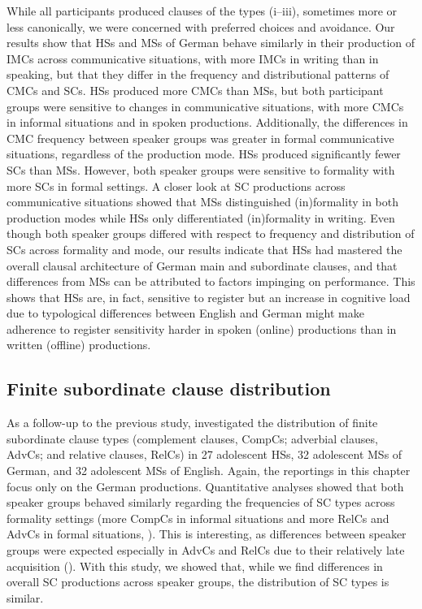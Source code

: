 \documentclass[output=paper]{langscibook}
\begin{document}
While all participants produced clauses of the types (i--iii), sometimes more or less canonically, we were concerned with preferred choices and avoidance. Our results show that HSs and MSs of German behave similarly in their production of IMCs across communicative situations, with more IMCs in writing than in speaking, but that they differ in the frequency and distributional patterns of CMCs and SCs. HSs produced more CMCs than MSs, but both participant groups were sensitive to changes in communicative situations, with more CMCs in informal situations and in spoken productions. Additionally, the differences in CMC frequency between speaker groups was greater in formal communicative situations, regardless of the production mode. HSs produced significantly fewer SCs than MSs. However, both speaker groups were sensitive to formality with more SCs in formal settings. A closer look at SC productions across communicative situations showed that MSs distinguished (in)formality in both production modes while HSs only differentiated (in)formality in writing. Even though both speaker groups differed with respect to frequency and distribution of SCs across formality and mode, our results indicate that HSs had mastered the overall clausal architecture of German main and subordinate clauses, and that differences from MSs can be attributed to factors impinging on performance. This shows that HSs are, in fact, sensitive to register but an increase in cognitive load due to typological differences between English and German might make adherence to register sensitivity harder in spoken (online) productions than in written (offline) productions.

\subsection{Finite subordinate clause distribution}\label{sec:tsehaye:5.2}

As a follow-up to the previous study, \citet{TsehayeEtAl2021} investigated the distribution of finite subordinate clause types (complement clauses, CompCs; adverbial clauses, AdvCs; and relative clauses, RelCs) in 27 adolescent HSs, 32 adolescent MSs of German, and 32 adolescent MSs of English. Again, the reportings in this chapter focus only on the German productions. Quantitative analyses showed that both speaker groups behaved similarly regarding the frequencies of SC types across formality settings (more CompCs in informal situations and more RelCs and AdvCs in formal situations, ). This is interesting, as differences between speaker groups were expected especially in AdvCs and RelCs due to their relatively late acquisition (\citealt{ParadisEtAl2017, VasilyevaWaterfallHuttenlocher2008, AndreouTorregrossaBongartz2020}). With this study, we showed that, while we find differences in overall SC productions across speaker groups, the distribution of SC types is similar. 
\end{document}
